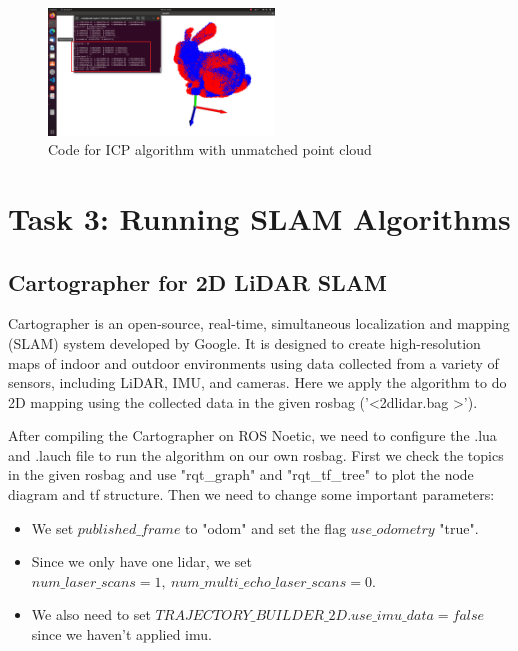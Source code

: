\documentclass[hyperref]{article}
\theoremstyle{nonumberplain}
\begin{document}
\begin{figure}[H]
	\centering
	\includegraphics[width=6cm]{2.3.png}
	\caption{Code for ICP algorithm with unmatched point cloud}
	\label{fig4}
\end{figure}






\section{Task 3: Running SLAM Algorithms}

\subsection{Cartographer for 2D LiDAR SLAM}

\hspace{1.0em}
Cartographer is an open-source, real-time, simultaneous localization and mapping (SLAM) system developed by Google. It is designed to create high-resolution maps of indoor and outdoor environments using data collected from a variety of sensors, including LiDAR, IMU, and cameras. Here we apply the algorithm to do 2D mapping using the collected data in the given rosbag ('\textless 2dlidar.bag \textgreater'). 

After compiling the Cartographer on ROS Noetic, we need to configure the .lua and .lauch file to run the algorithm on our own rosbag. First we check the topics in the given rosbag and use "rqt\_graph" and "rqt\_tf\_tree" to plot the node diagram and tf structure. Then we need to change some important parameters:

\begin{itemize}[itemsep=3pt,topsep=0pt,parsep=0pt]
	\item We set $published\_frame$ to "odom" and set the flag $use\_odometry$ "true".
	\item Since we only have one lidar, we set $num\_laser\_scans=1, \ num\_multi\_echo\_laser\_scans = 0$.
	\item We also need to set $TRAJECTORY\_BUILDER\_2D.use\_imu\_data = false$ since we haven't applied imu.
\end{itemize}
\end{document}
